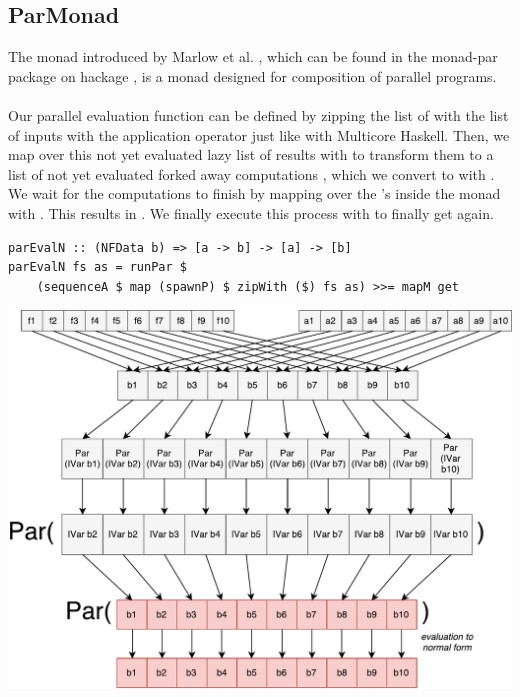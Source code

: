 \subsection{ParMonad}
The  monad introduced by Marlow et al. \cite{monad_par_paper_2011}, which can be found in the monad-par package on hackage \cite{monad_par_hackage}, is a monad designed for composition of parallel programs.
\\\\
Our parallel evaluation function  can be defined by zipping the list of \code{[a -> b]} with the list of inputs \code{[a]} with the application operator \code{\$} just like with Multicore Haskell. Then, we map over this not yet evaluated lazy list of results \code{[b]} with  to transform them to a list of not yet evaluated forked away computations , which we convert to  with . We wait for the computations to finish by mapping over the 's inside the  monad with . This results in . We finally execute this process with  to finally get \code{[b]} again.

\begin{lstlisting}[frame=htrbl]
parEvalN :: (NFData b) => [a -> b] -> [a] -> [b]
parEvalN fs as = runPar $ 
	(sequenceA $ map (spawnP) $ zipWith ($) fs as) >>= mapM get
\end{lstlisting}
\begin{center}
	\includegraphics[scale=0.5]{images/parEvalNParMonad}
\end{center}

